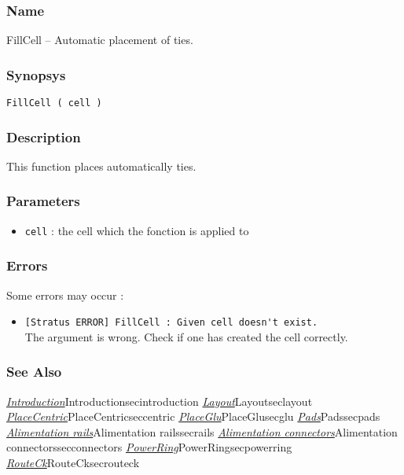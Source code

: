 \subsubsection{Name}

FillCell -- Automatic placement of ties.

\subsubsection{Synopsys}

\begin{verbatim}
FillCell ( cell )
\end{verbatim}

\subsubsection{Description}

This function places automatically ties.
    
\subsubsection{Parameters}

\begin{itemize}
    \item \verb-cell- : the cell which the fonction is applied to
\end{itemize}
    
%
%
\subsubsection{Errors}
    
Some errors may occur :
\begin{itemize}
    \item \verb-[Stratus ERROR] FillCell : Given cell doesn't exist.-\\The argument is wrong. Check if one has created the cell correctly.
\end{itemize}

\subsubsection{See Also}

\hyperref[ref]{\emph{Introduction}}{}{Introduction}{secintroduction}
\hyperref[ref]{\emph{Layout}}{}{Layout}{seclayout}
\hyperref[ref]{\emph{PlaceCentric}}{}{PlaceCentric}{seccentric}
\hyperref[ref]{\emph{PlaceGlu}}{}{PlaceGlu}{secglu}
\hyperref[ref]{\emph{Pads}}{}{Pads}{secpads}
\hyperref[ref]{\emph{Alimentation rails}}{}{Alimentation rails}{secrails}
\hyperref[ref]{\emph{Alimentation connectors}}{}{Alimentation connectors}{secconnectors}
\hyperref[ref]{\emph{PowerRing}}{}{PowerRing}{secpowerring}
\hyperref[ref]{\emph{RouteCk}}{}{RouteCk}{secrouteck}
